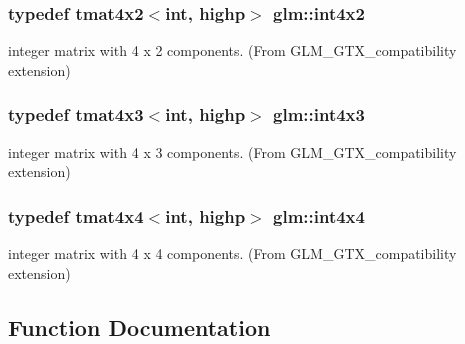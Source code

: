 \subsubsection[{int4x2}]{\setlength{\rightskip}{0pt plus 5cm}typedef tmat4x2$<$int, highp$>$ {\bf glm\+::int4x2}}\label{group__gtx__compatibility_ga91c24f1a2df5d20ea98f97ec243782c3}


integer matrix with 4 x 2 components. (From G\+L\+M\+\_\+\+G\+T\+X\+\_\+compatibility extension) 

\hypertarget{group__gtx__compatibility_ga08b035f86b94428f5913e48a4a074e97}{}
\subsubsection[{int4x3}]{\setlength{\rightskip}{0pt plus 5cm}typedef tmat4x3$<$int, highp$>$ {\bf glm\+::int4x3}}\label{group__gtx__compatibility_ga08b035f86b94428f5913e48a4a074e97}


integer matrix with 4 x 3 components. (From G\+L\+M\+\_\+\+G\+T\+X\+\_\+compatibility extension) 

\hypertarget{group__gtx__compatibility_ga1e72ab0f7e57aae3d07ef8880c11d8b7}{}
\subsubsection[{int4x4}]{\setlength{\rightskip}{0pt plus 5cm}typedef tmat4x4$<$int, highp$>$ {\bf glm\+::int4x4}}\label{group__gtx__compatibility_ga1e72ab0f7e57aae3d07ef8880c11d8b7}


integer matrix with 4 x 4 components. (From G\+L\+M\+\_\+\+G\+T\+X\+\_\+compatibility extension) 



\subsection{Function Documentation}
\hypertarget{group__gtx__compatibility_gac63011205bf6d0be82589dc56dd26708}{}
